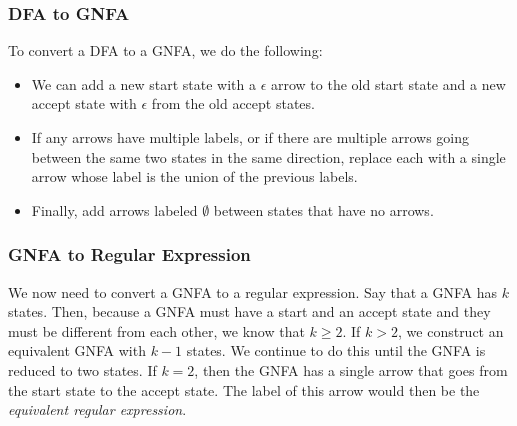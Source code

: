 \documentclass[letterpaper]{article}
\begin{document}
\subsubsection{DFA to GNFA}
To convert a DFA to a GNFA, we do the following: 
\begin{itemize}
    \item We can add a new start state with a $\epsilon$ arrow to the old start state and a new accept state with $\epsilon$ from the old accept states. 
    \item If any arrows have multiple labels, or if there are multiple arrows going between the same two states in the same direction, replace each with a single arrow whose label is the union of the previous labels.
    \item Finally, add arrows labeled $\emptyset$ between states that have no arrows. 
\end{itemize}

\subsubsection{GNFA to Regular Expression}
We now need to convert a GNFA to a regular expression. Say that a GNFA has $k$ states. Then, because a GNFA must have a start and an accept state and they must be different from each other, we know that $k \geq 2$. If $k > 2$, we construct an equivalent GNFA with $k - 1$ states. We continue to do this until the GNFA is reduced to two states. If $k = 2$, then the GNFA has a single arrow that goes from the start state to the accept state. The label of this arrow would then be the \emph{equivalent regular expression}.

\bigskip 
\end{document}
